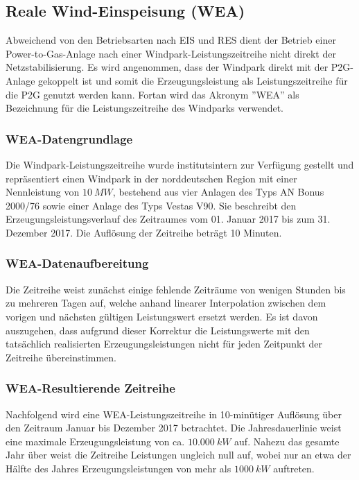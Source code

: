 \documentclass[onecolumn,10pt,titlepage]{article}
\begin{document}
\subsection{Reale Wind-Einspeisung (WEA)}
Abweichend von den Betriebsarten nach EIS und RES dient der Betrieb einer Power-to-Gas-Anlage nach einer Windpark-Leistungszeitreihe nicht direkt der Netzstabilisierung. Es wird angenommen, dass der Windpark direkt mit der P2G-Anlage gekoppelt ist und somit die Erzeugungsleistung als Leistungszeitreihe für die P2G genutzt werden kann. Fortan wird das Akronym ''WEA'' als Bezeichnung für die Leistungszeitreihe des Windparks verwendet.\\
\subsubsection{WEA-Datengrundlage}
Die Windpark-Leistungszeitreihe wurde institutsintern zur Verfügung gestellt und repräsentiert einen Windpark in der norddeutschen Region mit einer Nennleistung von $10 ~MW$, bestehend aus vier Anlagen des Typs AN Bonus 2000/76 sowie einer Anlage des Typs Vestas V90. Sie beschreibt den Erzeugungsleistungsverlauf des Zeitraumes vom 01. Januar 2017 bis zum 31. Dezember 2017. Die Auflösung der Zeitreihe beträgt 10 Minuten.
\subsubsection{WEA-Datenaufbereitung}
Die Zeitreihe weist zunächst einige fehlende Zeiträume von wenigen Stunden bis zu mehreren Tagen auf, welche anhand linearer Interpolation zwischen dem vorigen und nächsten gültigen Leistungswert ersetzt werden. Es ist davon auszugehen, dass aufgrund dieser Korrektur die Leistungswerte  mit den tatsächlich realisierten Erzeugungsleistungen nicht für jeden Zeitpunkt der Zeitreihe übereinstimmen.
\subsubsection{WEA-Resultierende Zeitreihe}


Nachfolgend wird eine WEA-Leistungszeitreihe in 10-minütiger Auflösung über den Zeitraum Januar bis Dezember 2017 betrachtet. Die Jahresdauerlinie weist eine maximale Erzeugungsleistung von  ca. $10.000 ~kW$ auf. Nahezu das gesamte Jahr über weist die Zeitreihe Leistungen ungleich null auf, wobei nur an etwa der Hälfte des Jahres Erzeugungsleistungen von mehr als $1000 ~kW$ auftreten. \\
\end{document}
